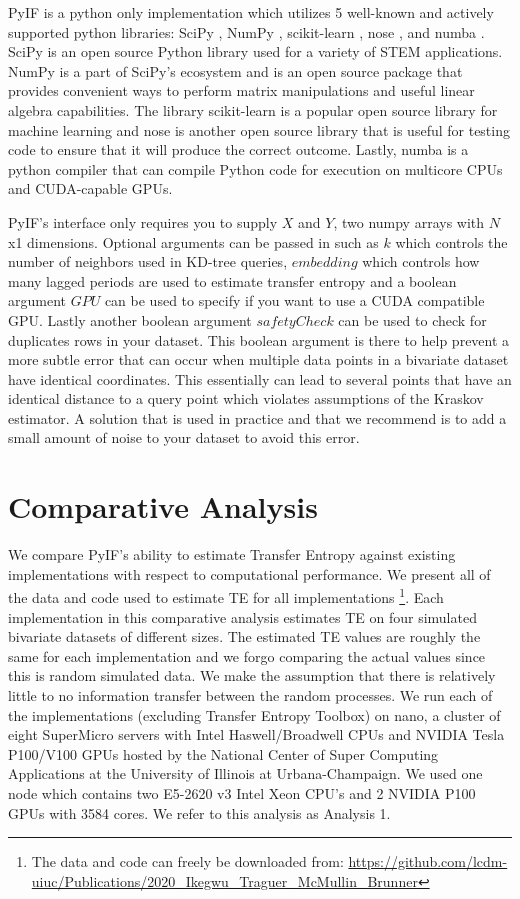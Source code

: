 \documentclass[conference]{IEEEtran}
\begin{document}
PyIF is a python only implementation which utilizes 5 well-known and actively supported python libraries: SciPy \cite{scipy}, NumPy \cite{numpy}, scikit-learn \cite{sklearn}, nose \cite{nose}, and numba \cite{numba}.  SciPy is an open source Python library used for a variety of STEM applications. NumPy  is a part of SciPy's ecosystem and is an open source package that provides convenient ways to perform matrix manipulations and useful linear algebra capabilities. The library scikit-learn is a popular open source library for machine learning and nose is another open source library that is useful for testing code to ensure that it will produce the correct outcome. Lastly, numba is a python compiler that can compile Python code for execution on multicore CPUs and CUDA-capable GPUs.

PyIF's  interface only requires you to supply \(X\) and \(Y\), two numpy arrays with \(N\)x1 dimensions. Optional arguments can be passed in such as \(k\) which controls the number of neighbors used in KD-tree queries, \(embedding\) which controls how many lagged periods are used to estimate transfer entropy and a boolean argument \(GPU\) can be used to specify if you want to use a CUDA compatible GPU. Lastly another boolean argument \(safetyCheck\) can be used to check for duplicates rows in your dataset. This boolean argument is there to help prevent a more subtle error that can occur when multiple data points in a bivariate dataset have identical coordinates. This essentially can lead to several points that have an identical distance to a query point which violates assumptions of the Kraskov estimator. A solution that is used in practice and that we recommend is to add a small amount of noise to your dataset to avoid this error.

\section{Comparative Analysis}

We compare PyIF's ability to estimate Transfer Entropy against existing implementations with respect to computational performance. We present all of the data and code used to estimate TE for all implementations \footnote{The data and code can freely be downloaded from: \url{https://github.com/lcdm-uiuc/Publications/2020\_Ikegwu\_Traguer\_McMullin\_Brunner}}. Each implementation in this comparative analysis estimates TE on four simulated bivariate datasets of different sizes. The estimated TE values are roughly the same for each implementation and we forgo comparing the actual values since this is random simulated data. We make the assumption that there is relatively little to no information transfer between the random processes. We run each of the implementations (excluding Transfer Entropy Toolbox)  on nano, a cluster of eight SuperMicro servers with Intel Haswell/Broadwell CPUs and NVIDIA Tesla P100/V100 GPUs hosted by the National Center of Super Computing Applications at the University of Illinois at Urbana-Champaign. We used one node which contains two E5-2620 v3 Intel Xeon CPU's and 2 NVIDIA P100 GPUs with 3584 cores.  We refer to this analysis as Analysis 1.
\end{document}
